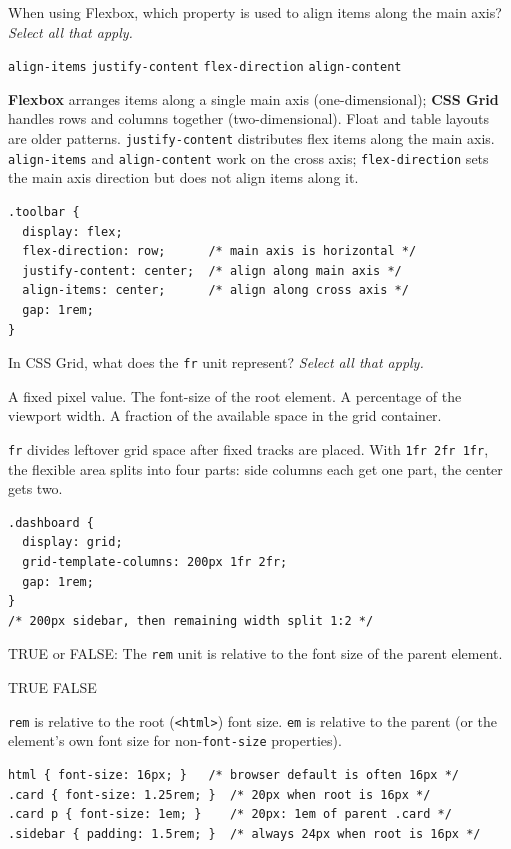 \question[4]
When using Flexbox, which property is used to align items along the main axis? \emph{Select all that apply.}
\begin{checkboxes}
  \choice \texttt{align-items}
  \CorrectChoice \texttt{justify-content}
  \choice \texttt{flex-direction}
  \choice \texttt{align-content}
\end{checkboxes}
\begin{solution}
  \textbf{Flexbox} arranges items along a single main axis (one-dimensional); \textbf{CSS Grid} handles rows and columns together (two-dimensional). Float and table layouts are older patterns. \texttt{justify-content} distributes flex items along the main axis. \texttt{align-items} and \texttt{align-content} work on the cross axis; \texttt{flex-direction} sets the main axis direction but does not align items along it.
\begin{lstlisting}[style=css]
.toolbar {
  display: flex;
  flex-direction: row;      /* main axis is horizontal */
  justify-content: center;  /* align along main axis */
  align-items: center;      /* align along cross axis */
  gap: 1rem;
}
\end{lstlisting}
\end{solution}

\question[4]
In CSS Grid, what does the \texttt{fr} unit represent? \emph{Select all that apply.}
\begin{checkboxes}
  \choice A fixed pixel value.
  \choice The font-size of the root element.
  \choice A percentage of the viewport width.
  \CorrectChoice A fraction of the available space in the grid container.
\end{checkboxes}
\begin{solution}
  \texttt{fr} divides leftover grid space after fixed tracks are placed. With \texttt{1fr 2fr 1fr}, the flexible area splits into four parts: side columns each get one part, the center gets two.
\begin{lstlisting}[style=css]
.dashboard {
  display: grid;
  grid-template-columns: 200px 1fr 2fr;
  gap: 1rem;
}
/* 200px sidebar, then remaining width split 1:2 */
\end{lstlisting}
\end{solution}

\question[4]
TRUE or FALSE: The \texttt{rem} unit is relative to the font size of the parent element.
\begin{choices}
  \choice TRUE
  \CorrectChoice FALSE
\end{choices}
\begin{solution}
  \texttt{rem} is relative to the root (\texttt{<html>}) font size. \texttt{em} is relative to the parent (or the element's own font size for non-\texttt{font-size} properties).
\begin{lstlisting}[style=css]
html { font-size: 16px; }   /* browser default is often 16px */
.card { font-size: 1.25rem; }  /* 20px when root is 16px */
.card p { font-size: 1em; }    /* 20px: 1em of parent .card */
.sidebar { padding: 1.5rem; }  /* always 24px when root is 16px */
\end{lstlisting}
\end{solution}

